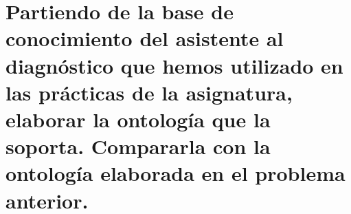 \documentclass[10pt, a4paper,spanish]{article}
\begin{document}
	\section{Partiendo de la base de conocimiento del asistente al diagnóstico que hemos utilizado en las prácticas de la asignatura, elaborar la ontología que la soporta. Compararla con la ontología elaborada en el problema anterior.}

		\paragraph{}
\end{document}
